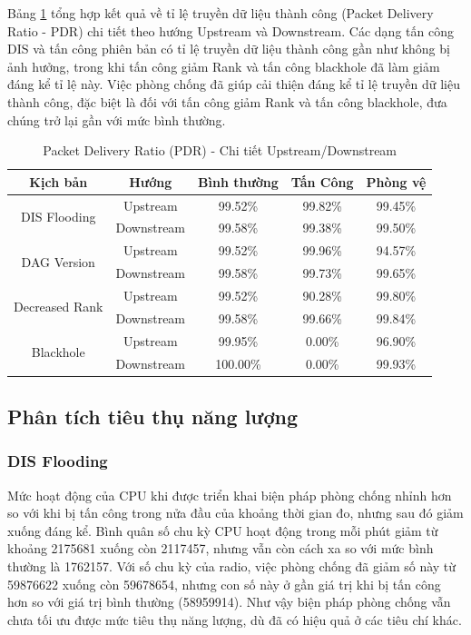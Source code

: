Bảng \ref{tab:pdr_detailed} tổng hợp kết quả về tỉ lệ truyền dữ liệu thành công (Packet Delivery Ratio - PDR) chi tiết theo hướng Upstream và Downstream. Các dạng tấn công DIS và tấn công phiên bản có tỉ lệ truyền dữ liệu thành công gần như không bị ảnh hưởng, trong khi tấn công giảm Rank và tấn công blackhole đã làm giảm đáng kể tỉ lệ này. Việc phòng chống đã giúp cải thiện đáng kể tỉ lệ truyền dữ liệu thành công, đặc biệt là đối với tấn công giảm Rank và tấn công blackhole, đưa chúng trở lại gần với mức bình thường.

\begin{table}[h]
\centering
\begin{tabular}{|c|c|c|c|c|}
\hline
\textbf{Kịch bản} & \textbf{Hướng} & \textbf{Bình thường} & \textbf{Tấn Công} & \textbf{Phòng vệ} \\
\hline
\multirow{2}{*}{DIS Flooding} & Upstream & 99.52\% & 99.82\% & 99.45\% \\
 & Downstream & 99.58\% & 99.38\% & 99.50\% \\
\hline
\multirow{2}{*}{DAG Version} & Upstream & 99.52\% & 99.96\% & 94.57\% \\
 & Downstream & 99.58\% & 99.73\% & 99.65\% \\
\hline
\multirow{2}{*}{Decreased Rank} & Upstream & 99.52\% & 90.28\% & 99.80\% \\
 & Downstream & 99.58\% & 99.66\% & 99.84\% \\
\hline
\multirow{2}{*}{Blackhole} & Upstream & 99.95\% & 0.00\% & 96.90\% \\
 & Downstream & 100.00\% & 0.00\% & 99.93\% \\
\hline
\end{tabular}
\caption{Packet Delivery Ratio (PDR) - Chi tiết Upstream/Downstream}
\label{tab:pdr_detailed}
\end{table}

\subsection{Phân tích tiêu thụ năng lượng}

\subsubsection{DIS Flooding}
Mức hoạt động của CPU khi được triển khai biện pháp phòng chống nhỉnh hơn so với khi bị tấn công trong nửa đầu của khoảng thời gian đo, nhưng sau đó giảm xuống đáng kể. Bình quân số chu kỳ CPU hoạt động trong mỗi phút giảm từ khoảng 2175681 xuống còn 2117457, nhưng vẫn còn cách xa so với mức bình thường là 1762157. Với số chu kỳ của radio, việc phòng chống đã giảm số này từ 59876622 xuống còn 59678654, nhưng con số này ở gần giá trị khi bị tấn công hơn so với giá trị bình thường (58959914). Như vậy biện pháp phòng chống vẫn chưa tối ưu được mức tiêu thụ năng lượng, dù đã có hiệu quả ở các tiêu chí khác.

